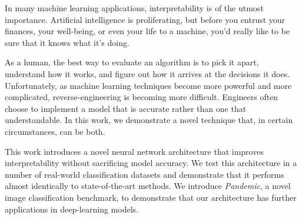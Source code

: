 
In many machine learning applications, interpretability is of the utmost importance. Artificial intelligence is proliferating, but before you entrust your finances, your well-being, or even your life to a machine, you'd really like to be sure that it knows what it's doing. 

As a human, the best way to evaluate an algorithm is to pick it apart, understand how it works, and figure out how it arrives at the decisions it does. Unfortunately, as machine learning techniques become more powerful and more complicated, reverse-engineering is becoming more difficult. Engineers often choose to implement a model that is accurate rather than one that understandable. In this work, we demonstrate a novel technique that, in certain circumstances, can be both. 

This work introduces a novel neural network architecture that improves interpretability without sacrificing model accuracy. We test this architecture in a number of real-world classification datasets and demonstrate that it performs almost identically to state-of-the-art methods. We introduce \textit{Pandemic}, a novel image classification benchmark, to demonstrate that our architecture has further applications in deep-learning models. 